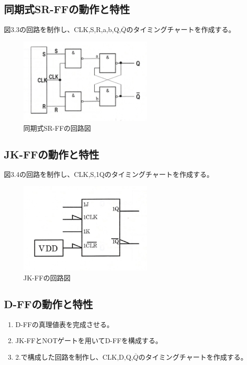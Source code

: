 \documentclass{jlreq}
\numberwithin{equation}{section}
\begin{document}
\subsection{同期式SR-FFの動作と特性}
図3.3の回路を制作し、CLK,S,R,a,b,Q,\(\overline{Q}\)のタイミングチャートを作成する。

\begin{figure}[H]
  \centering
  \includegraphics[width=0.6\textwidth]{assets/srffkairo.png}
  \caption{同期式SR-FFの回路図}
\end{figure}

\subsection{JK-FFの動作と特性}
図3.4の回路を制作し、CLK,S,1Qのタイミングチャートを作成する。

\begin{figure}[H]
  \centering
  \includegraphics[width=0.6\textwidth]{assets/jkffkairo.png}
  \caption{JK-FFの回路図}
\end{figure}

\subsection{D-FFの動作と特性}
\begin{enumerate}
  \item D-FFの真理値表を完成させる。
  \item JK-FFとNOTゲートを用いてD-FFを構成する。
  \item 2.で構成した回路を制作し、CLK,D,Q,\(\overline{Q}\)のタイミングチャートを作成する。
\end{enumerate}
\end{document}
